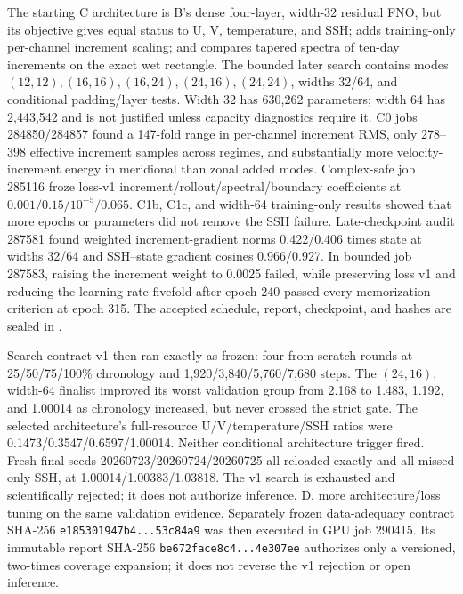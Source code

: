 \documentclass[11pt]{article}
\begin{document}
{The starting C architecture is B's dense four-layer, width-32 residual FNO, but its
objective gives equal status to U, V, temperature, and SSH; adds training-only
per-channel increment scaling; and compares tapered spectra of ten-day increments on
the exact wet rectangle.  The bounded later search contains modes
\((12,12),(16,16),(16,24),(24,16),(24,24)\), widths 32/64, and conditional padding/layer
tests.  Width 32 has 630,262 parameters; width 64 has 2,443,542 and is not justified
unless capacity diagnostics require it.  C0 jobs 284850/284857 found a 147-fold range
in per-channel increment RMS, only 278--398 effective increment samples across regimes,
and substantially more velocity-increment energy in meridional than zonal added modes.
Complex-safe job 285116 froze loss-v1 increment/rollout/spectral/boundary coefficients
at \(0.001/0.15/10^{-5}/0.065\).  C1b, C1c, and width-64 training-only results showed
that more epochs or parameters did not remove the SSH failure.  Late-checkpoint audit
287581 found weighted increment-gradient norms 0.422/0.406 times state at widths 32/64
and SSH--state gradient cosines 0.966/0.927.  In bounded job 287583, raising the
increment weight to 0.0025 failed, while preserving loss v1 and reducing the learning
rate fivefold after epoch 240 passed every memorization criterion at epoch 315.
The accepted schedule, report, checkpoint, and hashes are sealed in
.

Search contract v1 then ran exactly as frozen: four from-scratch rounds at
25/50/75/100\% chronology and 1,920/3,840/5,760/7,680 steps.  The \((24,16)\),
width-64 finalist improved its worst validation group from 2.168 to 1.483, 1.192, and
1.00014 as chronology increased, but never crossed the strict gate.  The selected
architecture's full-resource U/V/temperature/SSH ratios were
0.1473/0.3547/0.6597/1.00014.  Neither conditional architecture trigger fired.
Fresh final seeds 20260723/20260724/20260725 all reloaded exactly and all missed only
SSH, at 1.00014/1.00383/1.03818.  The v1 search is exhausted and scientifically
rejected; it does not authorize inference, D, more architecture/loss tuning on the
same validation evidence.  Separately frozen data-adequacy contract SHA-256
\texttt{e185301947b4...53c84a9} was then executed in GPU job 290415.  Its immutable
report SHA-256 \texttt{be672face8c4...4e307ee} authorizes only a versioned,
two-times coverage expansion; it does not reverse the v1 rejection or open inference.}
\end{document}
